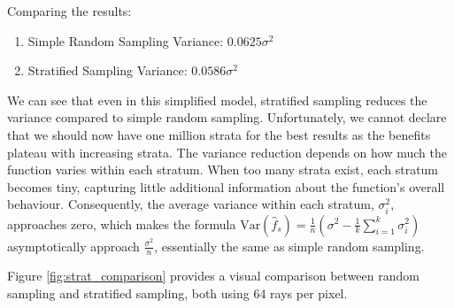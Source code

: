 \documentclass[12pt]{article}
\begin{document}
Comparing the results:
\begin{enumerate}
    \item[] Simple Random Sampling Variance: $0.0625\sigma^2$
    \item[] Stratified Sampling Variance: $0.0586\sigma^2$
\end{enumerate}

We can see that even in this simplified model, stratified sampling reduces the variance compared to simple random sampling. Unfortunately, we cannot declare that we should now have one million strata for the best results as the benefits plateau with increasing strata. The variance reduction depends on how much the function varies within each stratum. When too many strata exist, each stratum becomes tiny, capturing little additional information about the function's overall behaviour. Consequently, the average variance within each stratum, $\sigma_i^2$, approaches zero, which makes the formula $\text{Var}(\hat{f}_s) = \frac{1}{n} \left( \sigma^2 - \frac{1}{k} \sum_{i=1}^k \sigma_i^2 \right)$ asymptotically approach $\frac{\sigma^2}{n}$, essentially the same as simple random sampling.

Figure \ref{fig:strat_comparison} provides a visual comparison between random sampling and stratified sampling, both using 64 rays per pixel.
\end{document}
